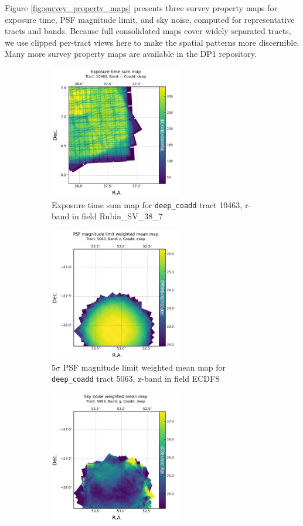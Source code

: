 Figure \ref{fig:survey_property_maps} presents three survey property maps for exposure time, \gls{PSF} magnitude limit, and sky noise, computed for representative tracts and bands.
Because full consolidated maps cover widely separated tracts, we use clipped per-\gls{tract} views here to make the spatial patterns more discernible.
Many more survey property maps are available in the DP1 repository.
\begin{figure}[hbt!]
  \centering
  \begin{subfigure}[t]{0.31\textwidth}
  \includegraphics[width=\linewidth, height=5.8cm]{deepCoadd_exposure_time_map_sum_tract10463_rband}
  \caption{Exposure time sum map for \texttt{deep\_coadd} \gls{tract} 10463, r-band in field Rubin\_SV\_38\_7}
  \end{subfigure}\hfill
  \begin{subfigure}[t]{0.31\textwidth}
  \includegraphics[width=\linewidth, height=5.8cm]{deepCoadd_psf_maglim_map_weighted_mean_tract5063_zband}
  \caption{5$\sigma$ \gls{PSF} magnitude limit weighted mean map for \texttt{deep\_coadd} \gls{tract} 5063, z-band in field ECDFS}
  \end{subfigure}\hfill
    \begin{subfigure}[t]{0.31\textwidth}
  \includegraphics[width=\linewidth, height=5.8cm]{deepCoadd_sky_noise_map_weighted_mean_tract5063_gband}

\end{subfigure}
\end{figure}
